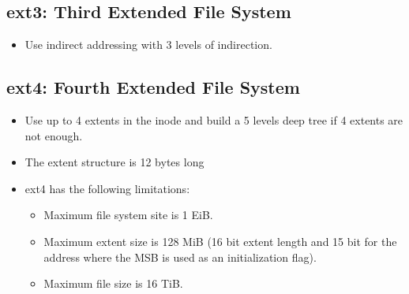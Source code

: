         \subsection{ext3: Third Extended File System}
            \begin{itemize}
            	\item Use indirect addressing with 3 levels of indirection.
            \end{itemize}
        

        \subsection{ext4: Fourth Extended File System}
            \begin{itemize}
            	\item Use up to 4 extents in the inode and build a 5 levels deep tree if 4 extents are not enough.
            	\item The extent structure is 12 bytes long
            	\item ext4 has the following limitations:
                	\begin{itemize}
                		\item Maximum file system site is 1 EiB.
                		\item Maximum extent size is 128 MiB (16 bit extent length and 15 bit for the address where the MSB is used as an initialization flag).
                		\item Maximum file size is 16 TiB.
                	\end{itemize}
            \end{itemize}

